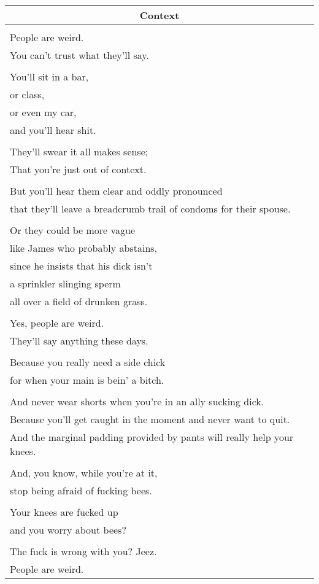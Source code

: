 \documentclass{article}
\begin{document}
\begin{center}
\begin{tabular}{l}
\multicolumn{1}{c}{\textbf{Context}} \\ \hline
\\
People are weird. \\
You can't trust what they'll say. \\
\\
You'll sit in a bar, \\
or class, \\
or even my car, \\
and you'll hear shit. \\
\\
They'll swear it all makes sense; \\
That you're just out of context. \\
\\
But you'll hear them clear and oddly pronounced \\
that they'll leave a breadcrumb trail of condoms for their spouse. \\
\\
Or they could be more vague \\
like James who probably abstains, \\
since he insists that his dick isn't \\
a sprinkler slinging sperm \\
all over a field of drunken grass. \\
\\
Yes, people are weird. \\
They'll say anything these days. \\
\\
Because you really need a side chick \\
for when your main is bein' a bitch. \\
\\
And never wear shorts when you're in an ally sucking dick. \\
Because you'll get caught in the moment and never want to quit. \\
And the marginal padding provided by pants will really help your knees. \\
\\
And, you know, while you're at it, \\
stop being afraid of fucking bees. \\
\\
Your knees are fucked up \\
and you worry about bees? \\
\\
The fuck is wrong with you? Jeez. \\
People are weird. \\
\end{tabular}
\end{center}
\end{document}

